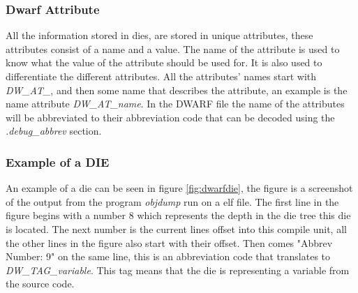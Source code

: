 

\subsubsection{Dwarf Attribute}\label{sec:dwarfattributes}
 


All the information stored in \glspl{die}, are stored in unique attributes, these attributes consist of a name and a value.
The name of the attribute is used to know what the value of the attribute should be used for.
It is also used to differentiate the different attributes.
All the attributes' names start with \emph{DW\_AT\_}, and then some name that describes the attribute, an example is the name attribute \emph{DW\_AT\_name}.
In the \gls{DWARF} file the name of the attributes will be abbreviated to their abbreviation code that can be decoded using the \emph{.debug\_abbrev} section.


\subsubsection{Example of a DIE}
An example of a \gls{die} can be seen in figure \ref{fig:dwarfdie}, the figure is a screenshot of the output from the program \emph{objdump} run on a \gls{elf} file.
The first line in the figure begins with a number $8$ which represents the depth in the \gls{die} tree this \gls{die} is located.
The next number is the current lines offset into this compile unit, all the other lines in the figure also start with their offset.
Then comes "Abbrev Number: 9" on the same line, this is an abbreviation code that translates to \emph{DW\_TAG\_variable}.
This tag means that the \gls{die} is representing a variable from the source code.


